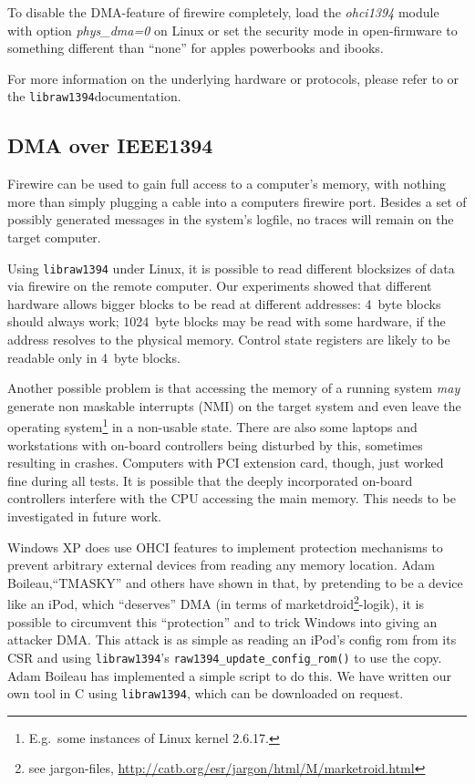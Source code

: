 To disable the DMA-feature of firewire completely, load the \emph{ohci1394}
module with option \emph{phys\_dma=0} on Linux or set the security mode in
open-firmware to something different than ``none'' for apples powerbooks and
ibooks. 

For more information on the underlying hardware or protocols, please refer to
\cite{OHCIspecs:2000,fwire_sys_arch:2222} or the
\texttt{libraw1394}\footnotemark[\value{footnote}] documentation.


\subsection{DMA over IEEE1394}

Firewire can be used to gain full access to a computer's memory, with nothing
more than simply plugging a cable into a computers firewire port. Besides a set
of possibly generated messages in the system's logfile, no traces will remain on
the target computer.


Using \texttt{libraw1394} under Linux, it is possible to read different
blocksizes of data via firewire on the remote computer. Our experiments showed
that different hardware allows bigger blocks to be read at different addresses:
4~byte blocks should always work; 1024~byte blocks may be read with some
hardware, if the address resolves to the physical memory. Control state
registers are likely to be readable only in 4~byte blocks.

Another possible problem is that accessing the memory of a running system
\emph{may} generate non maskable interrupts (NMI) on the target system and even
leave the operating system\footnote{E.g.~some instances of Linux kernel 2.6.17.}
in a non-usable state.  There are also some laptops and workstations with
on-board controllers being disturbed by this, sometimes resulting in crashes.
Computers with PCI extension card, though, just worked fine during all tests. It
is possible that the deeply incorporated on-board controllers interfere with the
CPU accessing the main memory. This needs to be investigated in future work.

\label{windows-dma} Windows XP does use OHCI features to implement protection
mechanisms to prevent arbitrary external devices from reading any memory
location.  Adam Boileau,``TMASKY'' and others have shown in
\cite{rux2k6firewire:2006} that, by pretending to be a device like an iPod,
which ``deserves'' DMA (in terms of marketdroid\footnote{see jargon-files,
\href{http://catb.org/esr/jargon/html/M/marketroid.html}
{http://catb.org/esr/jargon/html/M/marketroid.html}}-logik), it is possible to
circumvent this ``protection'' and to trick Windows into giving an attacker DMA.
This attack is as simple as reading an iPod's config rom from its CSR and using
\texttt{libraw1394}'s \texttt{raw1394\_update\_config\_rom()} to use the copy.
Adam Boileau has implemented a simple script to do this. We have written our own
tool in C using \texttt{libraw1394}, which can be downloaded on request.


